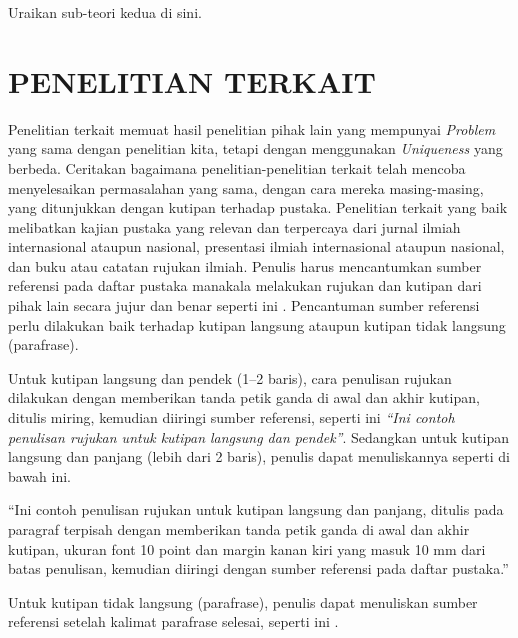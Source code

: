 Uraikan sub-teori kedua di sini.

\section{PENELITIAN TERKAIT}

Penelitian terkait memuat hasil penelitian pihak lain yang mempunyai \textit{Problem}
yang sama dengan penelitian kita, tetapi dengan menggunakan \textit{Uniqueness} yang
berbeda. Ceritakan bagaimana penelitian-penelitian terkait telah mencoba menyelesaikan
permasalahan yang sama, dengan cara mereka masing-masing, yang ditunjukkan dengan
kutipan terhadap pustaka. Penelitian terkait yang baik melibatkan kajian pustaka yang
relevan dan terpercaya dari jurnal ilmiah internasional ataupun nasional, presentasi
ilmiah internasional ataupun nasional, dan buku atau catatan rujukan ilmiah. Penulis
harus mencantumkan sumber referensi pada daftar pustaka manakala melakukan rujukan dan
kutipan dari pihak lain secara jujur dan benar seperti ini \cite{contoh_artikel}.
Pencantuman sumber referensi perlu dilakukan baik terhadap kutipan langsung ataupun
kutipan tidak langsung (parafrase).

Untuk kutipan langsung dan pendek (1--2 baris), cara penulisan rujukan dilakukan dengan
memberikan tanda petik ganda di awal dan akhir kutipan, ditulis miring, kemudian diiringi
sumber referensi, seperti ini \textit{``Ini contoh penulisan rujukan untuk kutipan
langsung dan pendek''}\cite{contoh_buku,contoh_artikel}. Sedangkan untuk kutipan langsung
dan panjang (lebih dari 2 baris), penulis dapat menuliskannya seperti di bawah ini.

\begin{kutipanpanjang}
  ``Ini contoh penulisan rujukan untuk kutipan langsung dan panjang, ditulis pada
  paragraf terpisah dengan memberikan tanda petik ganda di awal dan akhir kutipan,
  ukuran font 10 point dan margin kanan kiri yang masuk 10 mm dari batas penulisan,
  kemudian diiringi dengan sumber referensi pada daftar pustaka.'' \cite{contoh_buku}
\end{kutipanpanjang}

Untuk kutipan tidak langsung (parafrase), penulis dapat menuliskan sumber referensi
setelah kalimat parafrase selesai, seperti ini \cite{contoh_daring}.
